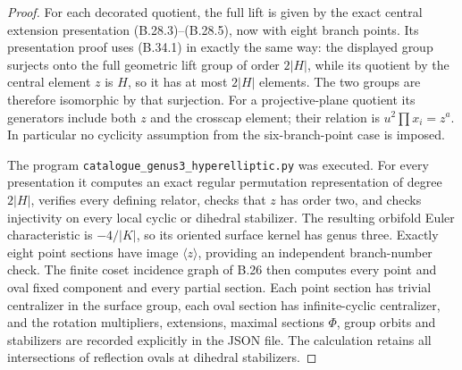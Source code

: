 \begin{proof}
For each decorated quotient, the full lift is given by the exact
central extension presentation (B.28.3)--(B.28.5), now with eight
branch points.  Its presentation proof uses (B.34.1) in exactly the
same way: the displayed group surjects onto the full geometric lift
group of order $2|H|$, while its quotient by the central element $z$
is $H$, so it has at most $2|H|$ elements.  The two groups are
therefore isomorphic by that surjection.  For a projective-plane
quotient its generators include both $z$ and the crosscap element;
their relation is $u^2\prod x_i=z^a$.  In particular no cyclicity
assumption from the six-branch-point case is imposed.

The program \texttt{catalogue\_genus3\_hyperelliptic.py} was executed.
For every presentation it computes an exact regular permutation
representation of degree $2|H|$, verifies every defining relator,
checks that $z$ has order two, and checks injectivity on every local
cyclic or dihedral stabilizer.  The resulting orbifold Euler
characteristic is $-4/|K|$, so its oriented surface kernel has genus
three.  Exactly eight point sections have image $\langle z\rangle$,
providing an independent branch-number check.
The finite coset incidence graph of B.26 then computes every point
and oval fixed component and every partial section.  Each point
section has trivial centralizer in the surface group, each oval
section has infinite-cyclic centralizer, and the rotation multipliers,
extensions, maximal sections $\Phi$, group orbits and stabilizers
are recorded explicitly in the JSON file.  The calculation retains
all intersections of reflection ovals at dihedral stabilizers.
\end{proof}

